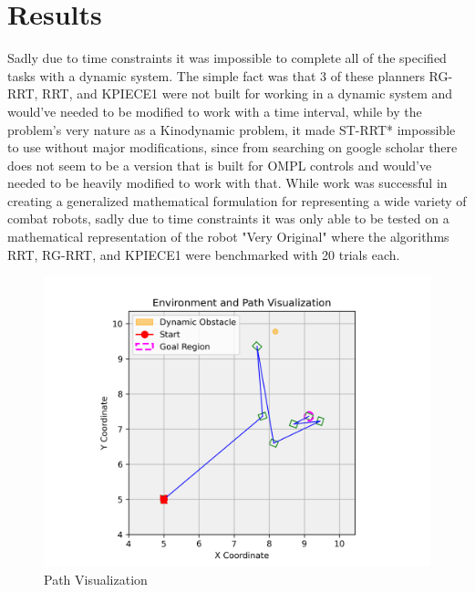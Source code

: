 \documentclass[conference]{IEEEtran}
\begin{document}
\section{Results}
Sadly due to time constraints it was impossible to complete all of the specified tasks with a dynamic system.  The simple fact was that 3 of these planners RG-RRT, RRT, and KPIECE1 were not built for working in a dynamic system and would've needed to be modified to work with a time interval, while by the problem's very nature as a Kinodynamic problem, it made ST-RRT* impossible to use without major modifications, since from searching on google scholar there does not seem to be a version that is built for OMPL controls and would've needed to be heavily modified to work with that.  While work was successful in creating a generalized mathematical formulation for representing a wide variety of combat robots, sadly due to time constraints it was only able to be tested on a mathematical representation of the robot "Very Original" where the algorithms RRT, RG-RRT, and KPIECE1 were benchmarked with 20 trials each.

\begin{figure}[htp]
\centering
\includegraphics[scale=0.6]{path_visualization.png}
\caption{Path Visualization}
\label{Path Visualization}
\end{figure}
\end{document}

